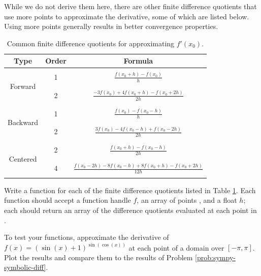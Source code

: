 While we do not derive them here, there are other finite difference quotients that use more points to approximate the derivative, some of which are listed below.
Using more points generally results in better convergence properties.

\begin{table}[H]
\centering
\begin{tabular}{|c|c|c|}
\hline
Type & Order & Formula \\
\hline \multirow{6}{*}{Forward} & & \\
    & 1 & \Large{$\frac{f(x_0+h) - f(x_0)}{h}$} \\
    & & \\
    \cline{2-3} & & \\
    & 2 & \Large{$\frac{-3f(x_0) + 4f(x_0+h) - f(x_0+2h)}{2h}$} \\
    & & \\
\hline \multirow{6}{*}{Backward} & & \\
    & 1 & \Large{$\frac{f(x_0) - f(x_0-h)}{h}$} \\
    & & \\
    \cline{2-3} & & \\
    & 2 & \Large{$\frac{3f(x_0) - 4f(x_0-h) + f(x_0-2h)}{2h}$} \\
    & & \\
\hline \multirow{6}{*}{Centered} & & \\
    & 2 & \Large{$\frac{f(x_0+h) - f(x_0-h)}{2h}$} \\
    & & \\
    \cline{2-3} & & \\
    & 4 & \Large{$\frac{f(x_0-2h) - 8f(x_0-h) + 8f(x_0+h) -f(x_0+2h)}{12h}$} \\
    & & \\
\hline
\end{tabular}
\caption{Common finite difference quotients for approximating $f'(x_0)$.}
\label{table:finite-difference-quotients}
\end{table}

\begin{problem} %
Write a function for each of the finite difference quotients listed in Table \ref{table:finite-difference-quotients}.
Each function should accept a function handle $f$, an array of points , and a float $h$; each should return an array of the difference quotients evaluated at each point in .

To test your functions, approximate the derivative of $f(x) = (\sin(x) + 1)^{\sin(\cos(x))}$ at each point of a domain over $[-\pi,\pi]$.
Plot the results and compare them to the results of Problem \ref{prob:sympy-symbolic-diff}.
\label{prob:implement-finite-difference-quotients}
\end{problem}

